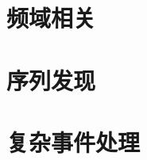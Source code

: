 \documentclass[cn,11pt,mode=simple,table]{elegantbook}
\begin{document}
\chapter{频域相关}





\chapter{序列发现}




\chapter{复杂事件处理}







\end{document}
